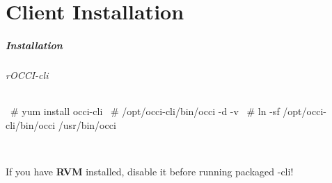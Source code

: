 \part{Client Installation}

\begin{frame}[fragile]
  \frametitle{Installation}
  \framesubtitle{rOCCI-cli}

\begin{terminalbox}{\normalsize}
~# yum install occi-cli
~# /opt/occi-cli/bin/occi -d -v
~# ln -sf /opt/occi-cli/bin/occi /usr/bin/occi
\end{terminalbox}

  \hfill\\
  \begin{center}
    If you have \textbf{RVM} installed, disable it before running packaged \rocci-cli!
  \end{center}
\end{frame}
